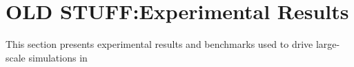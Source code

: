 \section{OLD STUFF:Experimental Results}

\label{sec:eval}



This section presents experimental results and benchmarks used to drive large-scale simulations in 






